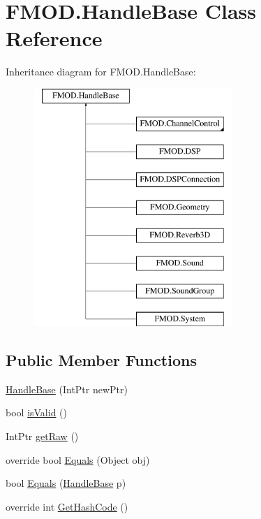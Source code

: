 \hypertarget{class_f_m_o_d_1_1_handle_base}{}\section{F\+M\+O\+D.\+Handle\+Base Class Reference}
\label{class_f_m_o_d_1_1_handle_base}
Inheritance diagram for F\+M\+O\+D.\+Handle\+Base\+:\begin{figure}[H]
\begin{center}
\leavevmode
\includegraphics[height=9.000000cm]{class_f_m_o_d_1_1_handle_base}
\end{center}
\end{figure}
\subsection*{Public Member Functions}
\begin{DoxyCompactItemize}
\item 
\hyperlink{class_f_m_o_d_1_1_handle_base_ae608e2ed16f62e4d75f04ccb53169b54}{Handle\+Base} (Int\+Ptr new\+Ptr)
\item 
bool \hyperlink{class_f_m_o_d_1_1_handle_base_a29ccee728a81e17757d3130e706ac390}{is\+Valid} ()
\item 
Int\+Ptr \hyperlink{class_f_m_o_d_1_1_handle_base_a06e50eebd10602d669c626256ffe7e3d}{get\+Raw} ()
\item 
override bool \hyperlink{class_f_m_o_d_1_1_handle_base_a8f97e5eb855012044db44105e322b5b1}{Equals} (Object obj)
\item 
bool \hyperlink{class_f_m_o_d_1_1_handle_base_acee2e0197d47be1d10de2e7df17f8f68}{Equals} (\hyperlink{class_f_m_o_d_1_1_handle_base}{Handle\+Base} p)
\item 
override int \hyperlink{class_f_m_o_d_1_1_handle_base_a757fb3c28cb42b7844cd491f7311706d}{Get\+Hash\+Code} ()
\end{DoxyCompactItemize}
